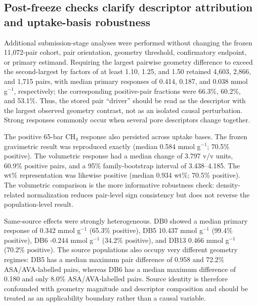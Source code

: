
\subsection{Post-freeze checks clarify descriptor attribution and uptake-basis robustness}

Additional submission-stage analyses were performed without changing the frozen
11,072-pair cohort, pair orientation, geometry threshold, confirmatory endpoint,
or primary estimand. Requiring the largest pairwise geometry difference to exceed
the second-largest by factors of at least 1.10, 1.25, and 1.50 retained 4,603,
2,866, and 1,715 pairs, with median primary responses of 0.414, 0.187, and
0.038 mmol g$^{-1}$, respectively; the corresponding positive-pair fractions were
66.3\%, 60.2\%, and 53.1\%. Thus, the stored pair ``driver'' should be read as the
descriptor with the largest observed geometry contrast, not as an isolated causal
perturbation. Strong responses commonly occur when several pore descriptors change
together.

The positive 65-bar CH$_4$ response also persisted across uptake bases. The frozen
gravimetric result was reproduced exactly (median 0.584 mmol g$^{-1}$; 70.5\%
positive). The volumetric response had a median change of 3.797 v/v units, 60.9\%
positive pairs, and a 95\% family-bootstrap interval of 3.438--4.185. The wt\%
representation was likewise positive (median 0.934 wt\%; 70.5\% positive). The
volumetric comparison is the more informative robustness check: density-related
normalization reduces pair-level sign consistency but does not reverse the
population-level result.

Same-source effects were strongly heterogeneous. DB0 showed a median primary
response of 0.342 mmol g$^{-1}$ (65.3\% positive), DB5 10.437 mmol g$^{-1}$
(99.4\% positive), DB6 -0.244 mmol g$^{-1}$ (34.2\% positive), and DB13
0.466 mmol g$^{-1}$ (70.2\% positive). The source populations also occupy very
different geometry regimes: DB5 has a median maximum pair difference of 0.958 and
72.2\% ASA/AVA-labelled pairs, whereas DB6 has a median maximum difference of
0.180 and only 8.0\% ASA/AVA-labelled pairs. Source identity is therefore
confounded with geometry magnitude and descriptor composition and should be treated
as an applicability boundary rather than a causal variable.

